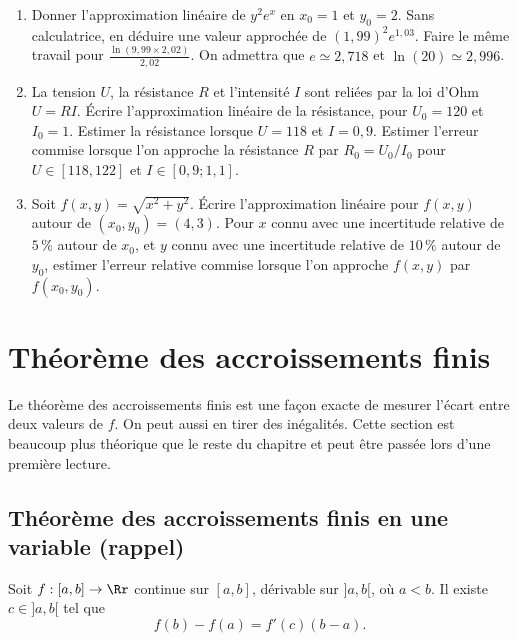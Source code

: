 \documentclass[11pt, class=report,crop=false]{standalone}
\begin{document}
\begin{miniexercices}
\sauteligne
\begin{enumerate}

  \item Donner l'approximation linéaire de $y^2e^x$ en $x_0=1$ et $y_0=2$. Sans calculatrice, en déduire une valeur approchée de $(1,99)^2 e^{1,03}$. Faire le même travail pour $\frac{\ln(9,99 \times 2,02)}{2,02}$.
  On admettra que $e \simeq 2,718$  et $\ln(20) \simeq 2,996$.
  
  \item La tension $U$, la résistance $R$ et l'intensité $I$ sont reliées par la loi d'Ohm $U = RI$. \'Ecrire l'approximation linéaire de la résistance, pour $U_0 = 120$ et $I_0 = 1$. Estimer la résistance lorsque $U = 118$ et $I = 0,9$.
  Estimer l'erreur commise lorsque l'on approche la résistance $R$ par $R_0 = U_0/I_0$ pour $U \in [118,122]$ et $I \in [0,9 ; 1,1]$.
  
  \item Soit $f(x,y) = \sqrt{x^2 + y^2}$. \'Ecrire l'approximation linéaire  pour $f(x,y)$ autour de $(x_0,y_0) = (4,3)$.
  Pour $x$ connu avec une incertitude relative de $5\,\%$ autour de $x_0$,
  et $y$ connu avec une incertitude relative de $10\,\%$ autour de $y_0$, estimer l'erreur relative commise lorsque l'on approche $f(x,y)$ par $f(x_0,y_0)$.
    
\end{enumerate}
\end{miniexercices}


\section{Théorème des accroissements finis}

Le théorème des accroissements finis est une façon exacte de mesurer l'écart entre deux valeurs de $f$. On peut aussi en tirer des inégalités. Cette section est beaucoup plus théorique que le reste du chapitre et peut être passée lors d'une première lecture.


\subsection{Théorème des accroissements finis en une variable (rappel)}

\begin{theoreme}
Soit $f:[a,b] \rightarrow \Rr$ continue sur $[a,b]$, dérivable sur $]a,b[$,  o\`u $a<b$. Il existe $c \in ]a,b[$ tel que
$$f(b)-f(a)=f'(c)(b-a).$$
\end{theoreme}
 
\end{document}
